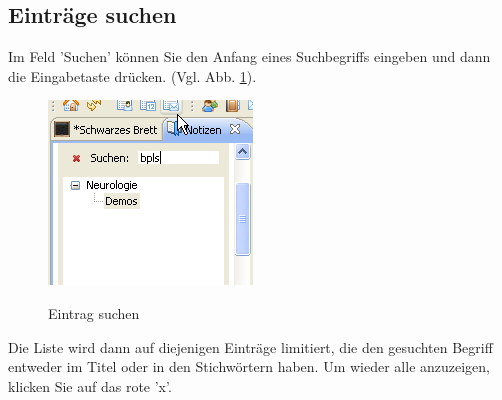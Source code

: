 \documentclass[a4paper]{scrartcl}
\begin{document}
\subsection{Einträge suchen}
Im Feld 'Suchen' können Sie den Anfang eines Suchbegriffs eingeben und dann die Eingabetaste drücken. (Vgl. Abb. \ref{fig:find}).
\begin{figure}
  \includegraphics{find}\\
  \caption{Eintrag suchen}\label{fig:find}
\end{figure}

Die Liste wird dann auf diejenigen Einträge limitiert, die den gesuchten Begriff entweder im Titel oder in den Stichwörtern haben. Um wieder alle anzuzeigen, klicken Sie auf das rote 'x'.
\end{document}

